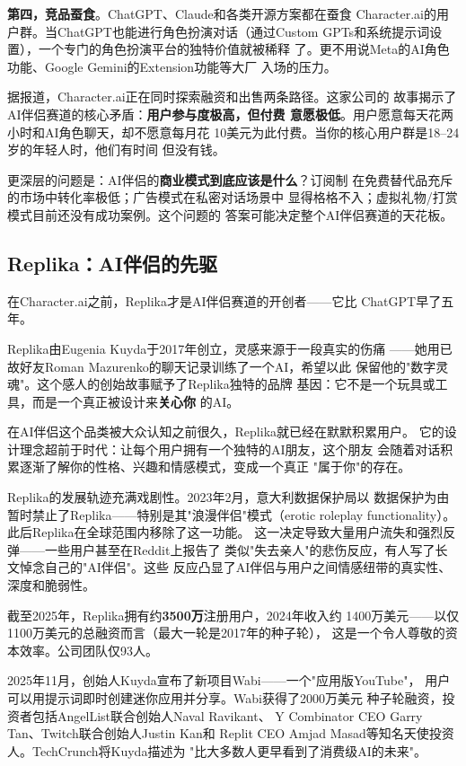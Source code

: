 \textbf{第四，竞品蚕食}。ChatGPT、Claude和各类开源方案都在蚕食
Character.ai的用户群。当ChatGPT也能进行角色扮演对话（通过Custom
GPTs和系统提示词设置），一个专门的角色扮演平台的独特价值就被稀释
了。更不用说Meta的AI角色功能、Google Gemini的Extension功能等大厂
入场的压力。

据报道，Character.ai正在同时探索融资和出售两条路径。这家公司的
故事揭示了AI伴侣赛道的核心矛盾：\textbf{用户参与度极高，但付费
意愿极低}。用户愿意每天花两小时和AI角色聊天，却不愿意每月花
10美元为此付费。当你的核心用户群是18--24岁的年轻人时，他们有时间
但没有钱。

更深层的问题是：AI伴侣的\textbf{商业模式到底应该是什么}？订阅制
在免费替代品充斥的市场中转化率极低；广告模式在私密对话场景中
显得格格不入；虚拟礼物/打赏模式目前还没有成功案例。这个问题的
答案可能决定整个AI伴侣赛道的天花板。

\subsection{Replika：AI伴侣的先驱}
\label{subsec:replika}

在Character.ai之前，Replika才是AI伴侣赛道的开创者——它比
ChatGPT早了五年。

Replika由Eugenia Kuyda于2017年创立，灵感来源于一段真实的伤痛
——她用已故好友Roman Mazurenko的聊天记录训练了一个AI，希望以此
保留他的"数字灵魂"。这个感人的创始故事赋予了Replika独特的品牌
基因：它不是一个玩具或工具，而是一个真正被设计来\textbf{关心你}
的AI。

在AI伴侣这个品类被大众认知之前很久，Replika就已经在默默积累用户。
它的设计理念超前于时代：让每个用户拥有一个独特的AI朋友，这个朋友
会随着对话积累逐渐了解你的性格、兴趣和情感模式，变成一个真正
"属于你"的存在。

Replika的发展轨迹充满戏剧性。2023年2月，意大利数据保护局以
数据保护为由暂时禁止了Replika——特别是其"浪漫伴侣"模式（erotic
roleplay functionality）。此后Replika在全球范围内移除了这一功能。
这一决定导致大量用户流失和强烈反弹——一些用户甚至在Reddit上报告了
类似"失去亲人"的悲伤反应，有人写了长文悼念自己的"AI伴侣"。这些
反应凸显了AI伴侣与用户之间情感纽带的真实性、深度和脆弱性。

截至2025年，Replika拥有约\textbf{3500万}注册用户，2024年收入约
1400万美元——以仅1100万美元的总融资而言（最大一轮是2017年的种子轮），
这是一个令人尊敬的资本效率。公司团队仅93人。

2025年11月，创始人Kuyda宣布了新项目Wabi——一个"应用版YouTube"，
用户可以用提示词即时创建迷你应用并分享。Wabi获得了2000万美元
种子轮融资，投资者包括AngelList联合创始人Naval Ravikant、
Y Combinator CEO Garry Tan、Twitch联合创始人Justin Kan和
Replit CEO Amjad Masad等知名天使投资人。TechCrunch将Kuyda描述为
"比大多数人更早看到了消费级AI的未来"。

